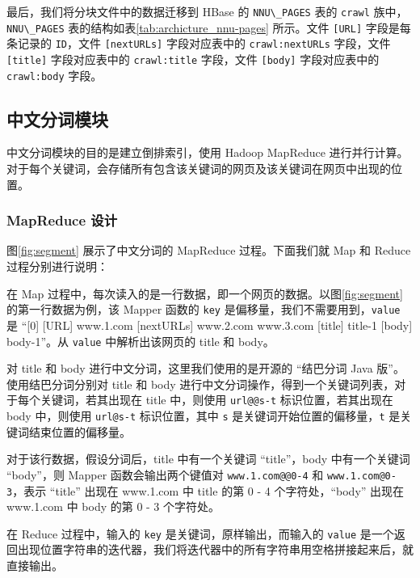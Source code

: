 \documentclass{ctexart}
\newcommand{\code}[1]{\colorbox{backcolor}{\lstinline|#1|}}
\begin{document}
    最后，我们将分块文件中的数据迁移到 HBase 的 \code{NNU\_PAGES} 表的 \code{crawl} 族中，\code{NNU\_PAGES} 表的结构如表\ref{tab:archicture_nnu-pages} 所示。文件 \code{[URL]} 字段是每条记录的 \code{ID}，文件 \code{[nextURLs]} 字段对应表中的 \code{crawl:nextURLs} 字段，文件 \code{[title]} 字段对应表中的 \code{crawl:title} 字段，文件 \code{[body]} 字段对应表中的 \code{crawl:body} 字段。

    \subsection{中文分词模块}\label{subsec:segment}

    中文分词模块的目的是建立倒排索引，使用 Hadoop MapReduce 进行并行计算。对于每个关键词，会存储所有包含该关键词的网页及该关键词在网页中出现的位置。

    \subsubsection{MapReduce 设计}\label{subsubsec:segment_mapreduce}

    图\ref{fig:segment} 展示了中文分词的 MapReduce 过程。下面我们就 Map 和 Reduce 过程分别进行说明：

    在 Map 过程中，每次读入的是一行数据，即一个网页的数据。以图\ref{fig:segment} 的第一行数据为例，该 Mapper 函数的 \code{key} 是偏移量，我们不需要用到，\code{value} 是 “[0] [URL] www.1.com [nextURLs] www.2.com www.3.com [title] title-1 [body] body-1”。从 \code{value} 中解析出该网页的 title 和 body。

    对 title 和 body 进行中文分词，这里我们使用的是开源的 “结巴分词 Java 版”\cite{github-jieba-java}。使用结巴分词分别对 title 和 body 进行中文分词操作，得到一个关键词列表，对于每个关键词，若其出现在 title 中，则使用 \code{url@@s-t} 标识位置，若其出现在 body 中，则使用 \code{url@s-t} 标识位置，其中 \code{s} 是关键词开始位置的偏移量，\code{t} 是关键词结束位置的偏移量。

    对于该行数据，假设分词后，title 中有一个关键词 “title”，body 中有一个关键词 “body”，则 Mapper 函数会输出两个键值对 \code{www.1.com@@0-4} 和 \code{www.1.com@0-3}，表示 “title” 出现在 www.1.com 中 title 的第 0 - 4 个字符处，“body” 出现在 www.1.com 中 body 的第 0 - 3 个字符处。

    在 Reduce 过程中，输入的 \code{key} 是关键词，原样输出，而输入的 \code{value} 是一个返回出现位置字符串的迭代器，我们将迭代器中的所有字符串用空格拼接起来后，就直接输出。
\end{document}
